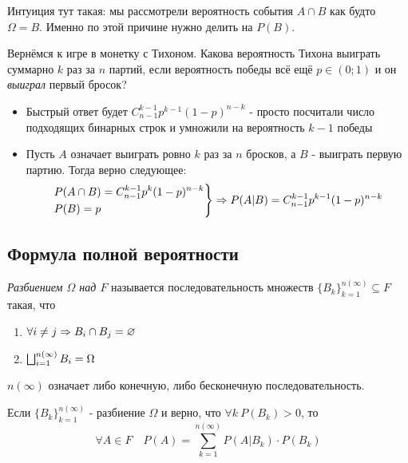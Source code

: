 \begin{note}
	Интуиция тут такая: мы рассмотрели вероятность события $A \cap B$ как будто $\Omega = B$. Именно по этой причине нужно делить на $P(B)$.
\end{note}

\begin{example}
	Вернёмся к игре в монетку с Тихоном. Какова вероятность Тихона выиграть суммарно $k$ раз за $n$ партий, если вероятность победы всё ещё $p \in (0; 1)$ и он \textit{выиграл} первый бросок?
	\begin{itemize}
		\item Быстрый ответ будет $C_{n - 1}^{k - 1} p^{k - 1} (1 - p)^{n - k}$ - просто посчитали число подходящих бинарных строк и умножили на вероятность $k - 1$ победы
		
		\item Пусть $A$ означает выиграть ровно $k$ раз за $n$ бросков, а $B$ - выиграть первую партию. Тогда верно следующее:
		\[
			\left.\begin{aligned}
				&{P(A \cap B) = C_{n - 1}^{k - 1} p^k (1 - p)^{n - k}} 
				\\
				&{P(B) = p}
			\end{aligned}\right\}
			\Rightarrow P(A|B) = C_{n - 1}^{k - 1} p^{k - 1} (1 - p)^{n - k}
		\]
	\end{itemize}
\end{example}

\subsection{Формула полной вероятности}

\begin{definition}
	\textit{Разбиением $\Omega$ над $F$} называется последовательность множеств $\{B_k\}_{k = 1}^{n(\infty)} \subseteq F$ такая, что
	\begin{enumerate}
		\item $\forall i \neq j \Rightarrow B_i \cap B_j = \varnothing$
		
		\item $\bigsqcup_{i = 1}^{n (\infty)} B_i = \Omega$
	\end{enumerate}
\end{definition}

\begin{note}
	$n(\infty)$ означает либо конечную, либо бесконечную последовательность.
\end{note}

\begin{theorem}
	Если $\{B_k\}_{k = 1}^{n(\infty)}$ - разбиение $\Omega$ и верно, что $\forall k\ P(B_k) > 0$, то
	\[
		\forall A \in F \quad P(A) = \sum_{k = 1}^{n(\infty)} P(A|B_k) \cdot P(B_k)
	\]
\end{theorem}

